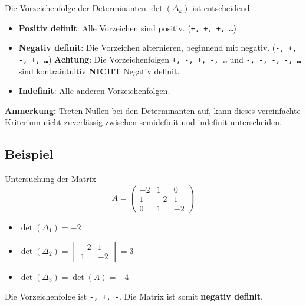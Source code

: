 Die Vorzeichenfolge der Determinanten \(\det(\Delta_k)\) ist entscheidend:
\begin{itemize}
    \item \textbf{Positiv definit}: Alle Vorzeichen sind positiv. (\texttt{+, +, +, \dots})
    \item \textbf{Negativ definit}: Die Vorzeichen alternieren, beginnend mit negativ. (\texttt{-, +, -, +, \dots}) \newline
            \textbf{Achtung}: Die Vorzeichenfolgen \texttt{+, -, +, -, \dots} und \texttt{-, -, -, -, \dots} sind kontraintuitiv \textbf{NICHT} Negativ definit.
    \item \textbf{Indefinit}: Alle anderen Vorzeichenfolgen.
\end{itemize}
\textbf{Anmerkung:} Treten Nullen bei den Determinanten auf, kann dieses vereinfachte Kriterium nicht zuverlässig zwischen semidefinit und indefinit unterscheiden.

\subsection{Beispiel}
Untersuchung der Matrix \[ A = \begin{pmatrix} -2 & 1 & 0 \\ 1 & -2 & 1 \\ 0 & 1 & -2 \end{pmatrix} \]
\begin{itemize}
    \item \(\det(\Delta_1) = -2\)
    \item \(\det(\Delta_2) = \begin{vmatrix} -2 & 1 \\ 1 & -2 \end{vmatrix} = 3\)
    \item \(\det(\Delta_3) = \det(A) = -4\)
\end{itemize}
Die Vorzeichenfolge ist \texttt{-, +, -}. Die Matrix ist somit \textbf{negativ definit}.